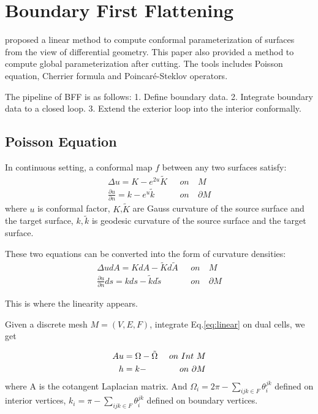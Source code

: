 \documentclass[fleqn,10pt]{wlscirep}
\begin{document}
\section{Boundary First Flattening }
\cite{1704.06873} proposed a linear method to compute conformal parameterization of surfaces from the view of differential geometry. This paper also provided a method to compute global parameterization after cutting. The tools includes Poisson equation, Cherrier formula and Poincar\'e-Steklov operators.

The pipeline of BFF is as follows:
1. Define boundary data. 
2. Integrate boundary data to a closed loop.
3. Extend the exterior loop into the interior conformally.

\subsection{Poisson Equation}

In continuous setting, a conformal map $f$ between any two surfaces satisfy:
\begin{equation}
\begin{split}
\Delta u = K - e^{2u} \tilde{K} \ \ \ &on\ &M\,\\
\frac{\partial u}{\partial n} = k - e^{u}\tilde{k} \ \ \ &on\     &\partial M
\end{split}
\end{equation}
where $u$ is conformal factor, $K$,$\tilde{K}$ are Gauss curvature of the source surface and  the target surface, $k, \tilde{k}$ is geodesic curvature of the source surface and the target surface.

These two equations can be converted into the form of curvature densities:
\begin{equation}
\begin{split}
\Delta udA = KdA - \tilde{K}d\tilde{A}  \ \ \ &on\ &M\,\\
\frac{\partial u}{\partial n} ds = kds - \tilde{k} d\tilde{s}\ \ \ &on\     &\partial M
\end{split}
\label{eq:linear}
\end{equation}

This is where the linearity appears.

Given a discrete mesh $M = (V, E, F)$, integrate Eq.\ref{eq:linear} on dual cells, we get

\begin{equation}
\begin{split}
Au &=   \Omega - \tilde\Omega\  &on\  Int\  M\\
h &= k - \title{k}\ \  &on\ \partial M 
\end{split}
\label{eq:poisson}
\end{equation}
where A is the cotangent Laplacian matrix.
And $\Omega_i = 2\pi - \sum_{ijk \in F}\theta_i^{jk}$ defined on interior vertices, $k_i = \pi - \sum_{ijk \in F}\theta_i^{jk}$ defined on boundary vertices.
\end{document}
